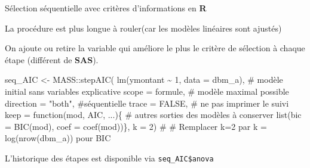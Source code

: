 \documentclass[
  ignorenonframetext,
]{beamer}
\newenvironment{Shaded}{\begin{snugshade}}{\end{snugshade}}
\newcommand{\AttributeTok}[1]{\textcolor[rgb]{0.40,0.45,0.13}{#1}}
\newcommand{\CommentTok}[1]{\textcolor[rgb]{0.37,0.37,0.37}{#1}}
\newcommand{\ConstantTok}[1]{\textcolor[rgb]{0.56,0.35,0.01}{#1}}
\newcommand{\ControlFlowTok}[1]{\textcolor[rgb]{0.00,0.23,0.31}{#1}}
\newcommand{\DecValTok}[1]{\textcolor[rgb]{0.68,0.00,0.00}{#1}}
\newcommand{\FunctionTok}[1]{\textcolor[rgb]{0.28,0.35,0.67}{#1}}
\newcommand{\NormalTok}[1]{\textcolor[rgb]{0.00,0.23,0.31}{#1}}
\newcommand{\OtherTok}[1]{\textcolor[rgb]{0.00,0.23,0.31}{#1}}
\newcommand{\SpecialCharTok}[1]{\textcolor[rgb]{0.37,0.37,0.37}{#1}}
\newcommand{\StringTok}[1]{\textcolor[rgb]{0.13,0.47,0.30}{#1}}
\begin{document}
\begin{frame}[fragile]{Sélection séquentielle avec critères
d'informations en \textbf{R}}
\protect\hypertarget{suxe9lection-suxe9quentielle-avec-crituxe8res-dinformations-en-r}{}
\footnotesize

La procédure est plus longue à rouler(car les modèles linéaires sont
ajustés)

On ajoute ou retire la variable qui améliore le plus le critère de
sélection à chaque étape (différent de \textbf{SAS}).

\begin{Shaded}
\begin{Highlighting}[numbers=left,,]
\NormalTok{seq\_AIC }\OtherTok{\textless{}{-}}\NormalTok{ MASS}\SpecialCharTok{::}\FunctionTok{stepAIC}\NormalTok{(}
  \FunctionTok{lm}\NormalTok{(ymontant }\SpecialCharTok{\textasciitilde{}} \DecValTok{1}\NormalTok{, }\AttributeTok{data =}\NormalTok{ dbm\_a), }
  \CommentTok{\# modèle initial sans variables explicative}
    \AttributeTok{scope =}\NormalTok{ formule, }\CommentTok{\# modèle maximal possible}
    \AttributeTok{direction =} \StringTok{"both"}\NormalTok{, }\CommentTok{\#séquentielle}
    \AttributeTok{trace =} \ConstantTok{FALSE}\NormalTok{, }\CommentTok{\# ne pas imprimer le suivi}
    \AttributeTok{keep =} \ControlFlowTok{function}\NormalTok{(mod, AIC, ...)\{ }
      \CommentTok{\# autres sorties des modèles à conserver}
      \FunctionTok{list}\NormalTok{(}\AttributeTok{bic =} \FunctionTok{BIC}\NormalTok{(mod), }
           \AttributeTok{coef =} \FunctionTok{coef}\NormalTok{(mod))\},}
    \AttributeTok{k =} \DecValTok{2}\NormalTok{) }\CommentTok{\#}
\CommentTok{\# Remplacer k=2 par k = log(nrow(dbm\_a)) pour BIC}
\end{Highlighting}
\end{Shaded}

L'historique des étapes est disponible via \texttt{seq\_AIC\$anova}

\normalsize
\end{frame}
\end{document}
